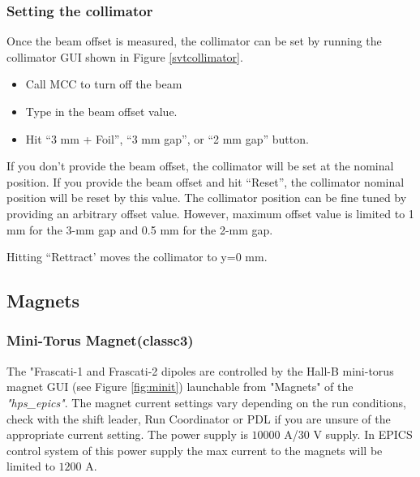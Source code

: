 \documentclass[12pt]{article}
\begin{document}
\subsubsection{Setting the collimator}

Once the beam offset is measured, the collimator can be set by running the collimator GUI shown in Figure \ref{svtcollimator}.

\begin{itemize}
\item Call MCC to turn off the beam 
\item Type in the beam offset value.
\item Hit ``3 mm + Foil'', ``3 mm gap'', or ``2 mm gap'' button.
\end{itemize}


If you don't provide the beam offset, the collimator will be set at the nominal position. If you provide the beam offset and hit ``Reset'', the collimator nominal position will be reset by this value. The collimator position can be fine tuned by providing an arbitrary offset value. However, maximum offset value is limited to 1 mm for the 3-mm gap and 0.5 mm for the 2-mm gap.

Hitting ``Rettract' moves the collimator to y=0 mm.
 

\subsection{Magnets}


\subsubsection{Mini-Torus Magnet(classc3)\label{sec:minit}}

The "Frascati-1 and Frascati-2 dipoles are controlled by the Hall-B mini-torus magnet GUI (see Figure \ref{fig:minit}) launchable
from "Magnets" of the \emph{"hps\_epics"}. The magnet current settings vary depending on the run
conditions, check with the shift leader, Run Coordinator or PDL if you are unsure
of the appropriate current setting. The power supply is $10000$ A/$30$ V supply. In EPICS control system of this power supply the max current to the magnets will be limited to $1200$ A. 
\end{document}
